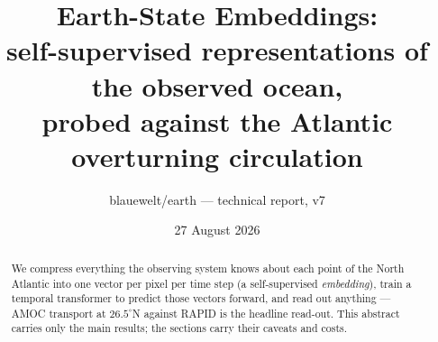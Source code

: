 \documentclass[10pt]{article}
\title{Earth-State Embeddings:\\
\large self-supervised representations of the observed ocean,\\
probed against the Atlantic overturning circulation}
\author{blauewelt/earth --- technical report, v7}
\date{27 August 2026}
\begin{document}
\maketitle

\begin{center}\end{center}

\begin{abstract}
We compress everything the observing system knows about each point of the
North Atlantic into one vector per pixel per time step (a self-supervised
\emph{embedding}), train a temporal transformer to predict those vectors
forward, and read out anything --- AMOC transport at $26.5^\circ$N
against RAPID is the headline read-out. This abstract carries only the
main results; the sections carry their caveats and costs.


\end{abstract}
\end{document}
